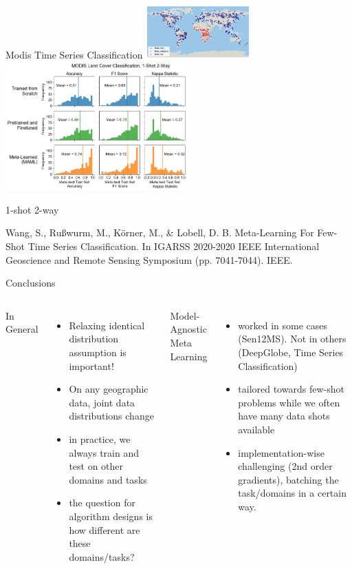 \documentclass[11pt]{beamer}
\newcommand{\citeapa}[1]{ {\tiny#1\par} }
\begin{document}
	\begin{frame}{Modis Time Series Classification}
		\centering
				\includegraphics[width=4cm]{igarss2020/modis_task_map}
				\includegraphics[width=7cm]{igarss2020/modis_africa_histograms_narrow}
				
		1-shot 2-way

		\citeapa{Wang, S., Rußwurm, M., Körner, M., \& Lobell, D. B. Meta-Learning For Few-Shot Time Series Classification. In IGARSS 2020-2020 IEEE International Geoscience and Remote Sensing Symposium (pp. 7041-7044). IEEE.}
	\end{frame}

	\begin{frame}{Conclusions}
		
		\begin{columns}[t]
				In General
				\begin{itemize}
					\item Relaxing identical distribution assumption is important!
					\item On any geographic data, joint data distributions change
					\item in practice, we always train and test on other domains and tasks
					\item the question for algorithm designs is how different are these domains/tasks?
				\end{itemize}
				Model-Agnostic Meta Learning
				\begin{itemize}
					\item worked in some cases (Sen12MS). Not in others (DeepGlobe, Time Series Classification)
					\item tailored towards few-shot problems while we often have many data shots available 
					\item implementation-wise challenging (2nd order gradients), batching the task/domains in a certain way.
				\end{itemize}
		\end{columns}
		
	\end{frame}
	
\end{document}
